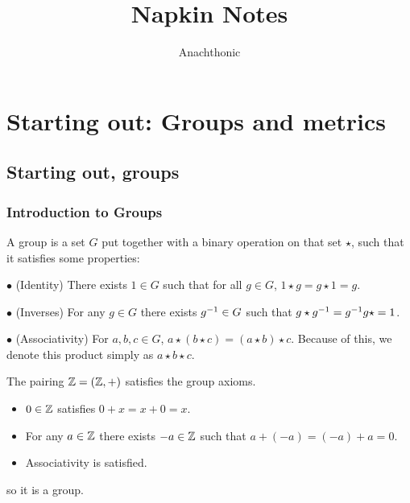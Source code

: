 \documentclass[11pt]{scrreport}
\begin{document}
\title{Napkin Notes}
\author{Anachthonic}
\maketitle
\tableofcontents
\part{Starting out: Groups and metrics}
\chapter{Starting out, groups}
\section{Introduction to Groups}
A group is a set $G$ put together with a binary operation on that set $\star$, such that it satisfies some properties:

$\bullet$ (Identity) There exists $1\in G$ such that for all $g\in G$, $1\star g = g\star 1 = g$.

$\bullet$ (Inverses) For any $g\in G$ there exists $g^{-1} \in G$ such that $g\star g^{-1} = g^{-1} g\star = 1$.

$\bullet$ (Associativity) For $a,b,c\in G$, $a\star(b\star c) = (a\star b)\star c$. Because of this, we denote this product simply as $a \star b \star c$.

\begin{example}
    The pairing $\mathbb Z = (\mathbb Z, +)$ satisfies the group axioms.
    \begin{itemize}
        \item $0\in \mathbb Z$ satisfies $0+x=x+0=x$.
        \item For any $a\in\mathbb Z$ there exists $-a\in\mathbb Z$ such that $a+(-a)=(-a)+a=0$.
        \item Associativity is satisfied.
    \end{itemize}
    so it is a group.
\end{example}
\end{document}
